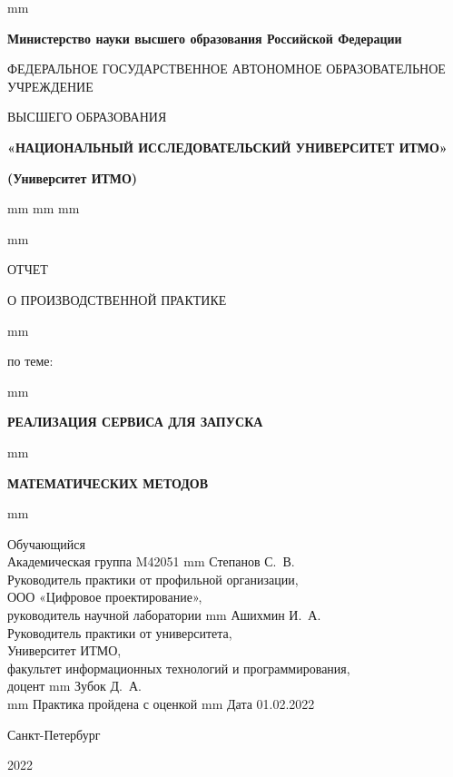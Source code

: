 \thispagestyle{empty}
 mm
\centerline{\footnotesize{\textbf{Министерство науки высшего образования Российской Федерации}}}
\centerline{\footnotesize{ФЕДЕРАЛЬНОЕ ГОСУДАРСТВЕННОЕ АВТОНОМНОЕ ОБРАЗОВАТЕЛЬНОЕ УЧРЕЖДЕНИЕ}}
\centerline{\small{ВЫСШЕГО ОБРАЗОВАНИЯ}}
\centerline{\textbf{«НАЦИОНАЛЬНЫЙ ИССЛЕДОВАТЕЛЬСКИЙ УНИВЕРСИТЕТ ИТМО»}}
\centerline{\textbf{(Университет ИТМО)}}
 mm
 mm
 mm



 mm
\centerline{\LARGE{ОТЧЕТ}}
\centerline{\LARGE{О ПРОИЗВОДСТВЕННОЙ ПРАКТИКЕ}}
 mm
\centerline{\large{по теме:}}
 mm
\centerline{\large\textbf{РЕАЛИЗАЦИЯ СЕРВИСА ДЛЯ ЗАПУСКА}}
 mm
\centerline{\large\textbf{МАТЕМАТИЧЕСКИХ МЕТОДОВ}}

 mm

\noindent Обучающийся \\
Академическая группа M42051  mm Степанов С.~В.\\

\noindent Руководитель практики от профильной организации, \\
ООО «Цифровое проектирование», \\
руководитель научной лаборатории  mm Ашихмин И.~А.\\

\noindent Руководитель практики от университета, \\
Университет ИТМО, \\
факультет информационных технологий и программирования, \\
доцент  mm Зубок Д.~А.\\

 mm
\hfill {Практика пройдена с оценкой \makebox[10mm]{\hrulefill} }
 mm
\hfill Дата 01.02.2022

\vfill \hfil \break
\centerline{\large Санкт-Петербург } \centerline{ 2022 }


